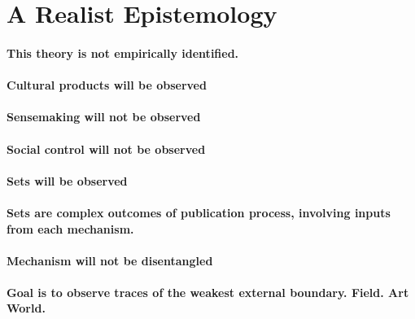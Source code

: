 \documentclass[]{article}
\begin{document}
\section{A Realist Epistemology}\label{a-realist-epistemology}

\paragraph{This theory is not empirically
identified.}\label{this-theory-is-not-empirically-identified.}

\paragraph{Cultural products will be
observed}\label{cultural-products-will-be-observed}

\paragraph{Sensemaking will not be
observed}\label{sensemaking-will-not-be-observed}

\paragraph{Social control will not be
observed}\label{social-control-will-not-be-observed}

\paragraph{Sets will be observed}\label{sets-will-be-observed}

\paragraph{Sets are complex outcomes of publication process, involving
inputs from each
mechanism.}\label{sets-are-complex-outcomes-of-publication-process-involving-inputs-from-each-mechanism.}

\paragraph{Mechanism will not be
disentangled}\label{mechanism-will-not-be-disentangled}

\paragraph{Goal is to observe traces of the weakest external boundary.
Field. Art
World.}\label{goal-is-to-observe-traces-of-the-weakest-external-boundary.-field.-art-world.}
\end{document}
